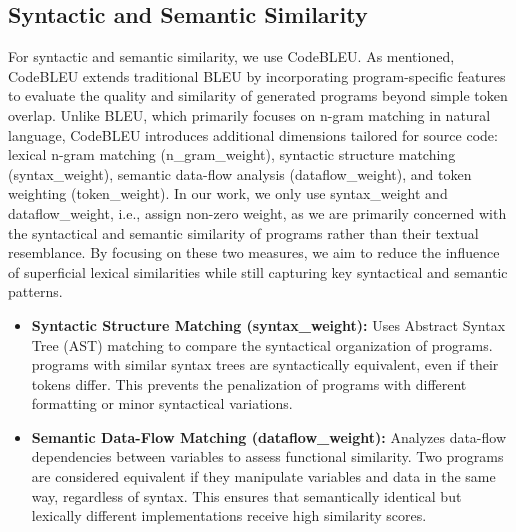 \documentclass{article}
\begin{document}
\subsection{Syntactic and Semantic Similarity}
For syntactic and semantic similarity, we use CodeBLEU. As mentioned, CodeBLEU extends traditional BLEU by incorporating program-specific features to evaluate the quality and similarity of generated programs beyond simple token overlap. 
Unlike BLEU, which primarily focuses on n-gram matching in natural language, CodeBLEU introduces additional dimensions tailored for source code: lexical n-gram matching (n\_gram\_weight), syntactic structure matching (syntax\_weight), semantic data-flow analysis (dataflow\_weight), and token weighting (token\_weight). 
In our work, we only use syntax\_weight  and dataflow\_weight, i.e., assign non-zero weight, as we are primarily concerned with the syntactical and semantic similarity of programs rather than their textual resemblance. By focusing on these two measures, we aim to reduce the influence of superficial lexical similarities while still capturing key syntactical and semantic patterns.

\begin{itemize}
    \item \textbf{Syntactic Structure Matching (syntax\_weight):}
Uses Abstract Syntax Tree (AST) matching to compare the syntactical organization of programs. programs with similar syntax trees are syntactically equivalent, even if their tokens differ. This prevents the penalization of programs with different formatting or minor syntactical variations.
    \item \textbf{Semantic Data-Flow Matching (dataflow\_weight):}
Analyzes data-flow dependencies between variables to assess functional similarity. Two programs are considered equivalent if they manipulate variables and data in the same way, regardless of syntax. This ensures that semantically identical but lexically different implementations receive high similarity scores.
\end{itemize}
\end{document}
